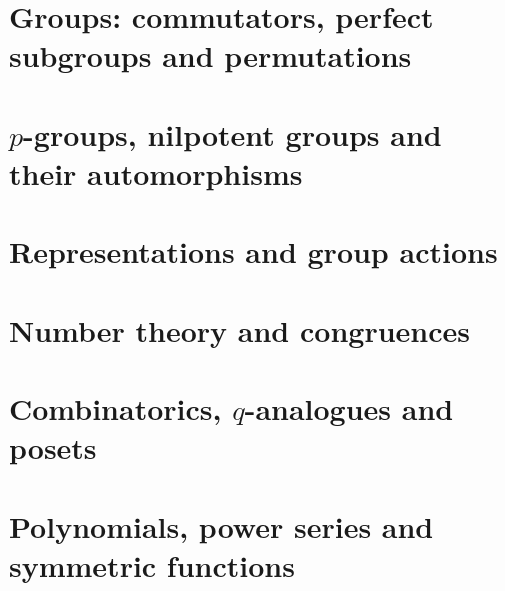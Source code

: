 \documentclass[11pt]{article}
\theoremstyle{plain}
\theoremstyle{definition}
\theoremstyle{remark}
\renewcommand{\_}{\bkunderscore\allowbreak}
\begin{document}
\part{Groups: commutators, perfect subgroups and permutations}








\part{$p$-groups, nilpotent groups and their automorphisms}






\part{Representations and group actions}





\part{Number theory and congruences}










\part{Combinatorics, $q$-analogues and posets}











\part{Polynomials, power series and symmetric functions}











\end{document}
